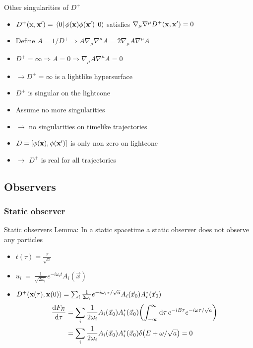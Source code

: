 \documentclass{beamer}
\renewcommand{\va}[1]{\vec{#1}}
\let\todox\todo
\renewcommand\todo[1]{\todox[inline]{#1}}
\begin{document}
\begin{frame}{Other singularities of \(D^+\)}
\begin{itemize}
	\item \(D^+(\vb{x},\vb{x}') = \bra*{0}\phi(\vb{x})\phi(\vb{x}')\ket*{0}\) satisfies \(\nabla_\mu\nabla^\mu D^+(\vb{x},\vb{x}') = 0\)
	\item Define \(A = 1/D^+ \Rightarrow A \nabla_\mu\nabla^\mu A = 2 \nabla_\mu A \nabla^\mu A\)
	\item \(D^+ = \infty \Rightarrow A = 0 \Rightarrow \nabla_\mu A \nabla^\mu A = 0\)
	\item[] \(\to D^+ = \infty\) is a lightlike hypersurface
	\item \(D^+\) is singular on the lightcone
	\item Assume no more singularities \todo{image} 
	\item[] \(\to\) no singularities on timelike trajectories 
	\item \(D = [\phi(\vb{x}),\phi(\vb{x}')]\) is only non zero on lightcone
	\item[] \(\to\) \(D^+\) is real for all trajectories 
\end{itemize}
\end{frame}

\subsection{Observers}
\subsubsection{Static observer}
\begin{frame}{Static observers}
Lemma: \todo{box} In a static spacetime a static observer does not observe any particles
\begin{itemize}
	\item \(t(\tau) = \frac{\tau}{\sqrt{a}}\)
	\item \(u_i~=~\frac{1}{\sqrt{2\omega_i}}e^{-i\omega_i t} A_i(\va{x})\)
	\item \(D^+(\vb{x}(\tau), \vb{x}(0)) = \sum_i \frac{1}{2\omega_i} e^{-i\omega_i\tau/\sqrt{a}} A_i(\va{x}_0)A_i^*(\va{x}_0)\)
	\begin{align*}
	\dv{F_E}{\tau} &= \sum_i \frac{1}{2\omega_i} A_i(\va{x}_0)A_i^*(\va{x}_0) \qty(\int_{-\infty}^\infty \dd{\tau} e^{-i E \tau} e^{-i\omega  \tau/\sqrt{a}})\\
	 	&= \sum_i \frac{1}{2\omega_i} A_i(\va{x}_0)A_i^*(\va{x}_0) \delta\qty(E + \omega/\sqrt{a}) = 0
	\end{align*}
\end{itemize}
\end{frame}
\end{document}
